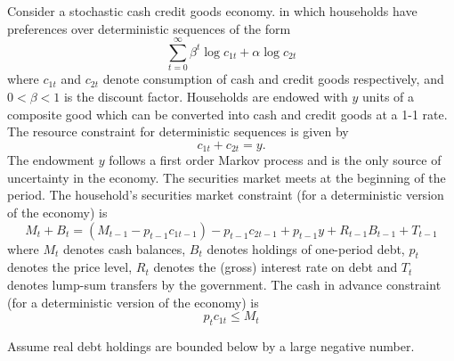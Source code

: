 \documentclass[11pt,english]{article}
\begin{document}
Consider a stochastic cash credit goods economy. in which households have
preferences over deterministic sequences of the form
\[
\sum_{t=0}^{\infty} \beta^t \log c_{1t} + \alpha \log c_{2t}
\]
where $c_{1t}$ and $c_{2t}$ denote consumption of cash and credit goods respectively,
and $0 < \beta < 1$ is the discount factor. Households are endowed with $y$ units of
a composite good which can be converted into cash and credit goods at a 1-1
rate. The resource constraint for deterministic sequences is given by
\[
c_{1t} + c_{2t} = y.
\]
The endowment $y$ follows a first order Markov process and is the only source
of uncertainty in the economy. The securities market meets at the beginning
of the period. The household's securities market constraint (for a deterministic
version of the economy) is
\[
M_t + B_t = (M_{t-1} - p_{t-1}c_{1t-1}) - p_{t-1}c_{2t-1} + p_{t-1}y + R_{t-1}B_{t-1} + T_{t-1}
\]
where $M_t$ denotes cash balances, $B_t$ denotes holdings of one-period debt,
$p_t$ denotes the price level, $R_t$ denotes the (gross) interest rate on debt and $T_t$
denotes lump-sum transfers by the government. The cash in advance constraint
(for a deterministic version of the economy) is
\[
p_t c_{1t} \leq M_t
\]

Assume real debt holdings are bounded below by a large negative number.
\end{document}
